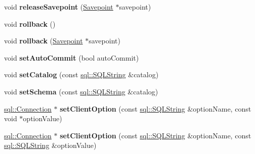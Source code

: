 \begin{DoxyCompactItemize}
\hypertarget{classsql_1_1mysql_1_1_my_s_q_l___connection_af85e740e1d7cc9f16d357afdd9f4419d}{}\label{classsql_1_1mysql_1_1_my_s_q_l___connection_af85e740e1d7cc9f16d357afdd9f4419d} 
void {\bfseries release\+Savepoint} (\hyperlink{classsql_1_1_savepoint}{Savepoint} $\ast$savepoint)
\item 
\hypertarget{classsql_1_1mysql_1_1_my_s_q_l___connection_a30102a74e65a62cff9c36ce77a8c7f44}{}\label{classsql_1_1mysql_1_1_my_s_q_l___connection_a30102a74e65a62cff9c36ce77a8c7f44} 
void {\bfseries rollback} ()
\item 
\hypertarget{classsql_1_1mysql_1_1_my_s_q_l___connection_a64fc3a6f403a19fee712142141a07ef4}{}\label{classsql_1_1mysql_1_1_my_s_q_l___connection_a64fc3a6f403a19fee712142141a07ef4} 
void {\bfseries rollback} (\hyperlink{classsql_1_1_savepoint}{Savepoint} $\ast$savepoint)
\item 
\hypertarget{classsql_1_1mysql_1_1_my_s_q_l___connection_a66dd8515ee9ccfe186fc1d2b597f220f}{}\label{classsql_1_1mysql_1_1_my_s_q_l___connection_a66dd8515ee9ccfe186fc1d2b597f220f} 
void {\bfseries set\+Auto\+Commit} (bool auto\+Commit)
\item 
\hypertarget{classsql_1_1mysql_1_1_my_s_q_l___connection_a85487982563f163064269bbe072bf2a0}{}\label{classsql_1_1mysql_1_1_my_s_q_l___connection_a85487982563f163064269bbe072bf2a0} 
void {\bfseries set\+Catalog} (const \hyperlink{classsql_1_1_s_q_l_string}{sql\+::\+S\+Q\+L\+String} \&catalog)
\item 
\hypertarget{classsql_1_1mysql_1_1_my_s_q_l___connection_ae9c04f366688e047e898487bc6fd6e1b}{}\label{classsql_1_1mysql_1_1_my_s_q_l___connection_ae9c04f366688e047e898487bc6fd6e1b} 
void {\bfseries set\+Schema} (const \hyperlink{classsql_1_1_s_q_l_string}{sql\+::\+S\+Q\+L\+String} \&catalog)
\item 
\hypertarget{classsql_1_1mysql_1_1_my_s_q_l___connection_a146973ddeaf89e344b719cefb09c55ad}{}\label{classsql_1_1mysql_1_1_my_s_q_l___connection_a146973ddeaf89e344b719cefb09c55ad} 
\hyperlink{classsql_1_1_connection}{sql\+::\+Connection} $\ast$ {\bfseries set\+Client\+Option} (const \hyperlink{classsql_1_1_s_q_l_string}{sql\+::\+S\+Q\+L\+String} \&option\+Name, const void $\ast$option\+Value)
\item 
\hypertarget{classsql_1_1mysql_1_1_my_s_q_l___connection_a2e01fff22d660d797501ac29e9a436e7}{}\label{classsql_1_1mysql_1_1_my_s_q_l___connection_a2e01fff22d660d797501ac29e9a436e7} 
\hyperlink{classsql_1_1_connection}{sql\+::\+Connection} $\ast$ {\bfseries set\+Client\+Option} (const \hyperlink{classsql_1_1_s_q_l_string}{sql\+::\+S\+Q\+L\+String} \&option\+Name, const \hyperlink{classsql_1_1_s_q_l_string}{sql\+::\+S\+Q\+L\+String} \&option\+Value)

\end{DoxyCompactItemize}
